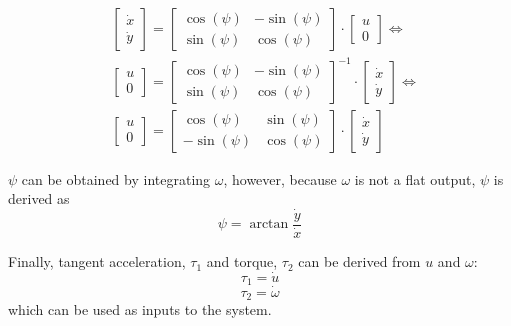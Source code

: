 \begin{equation}
\begin{split}
    & \begin{bmatrix}
        \dot{x} \\ \dot{y}
    \end{bmatrix} = 
    \begin{bmatrix}
        \cos(\psi) & - \sin(\psi) \\
        \sin(\psi) & \cos(\psi)
    \end{bmatrix} \cdot
    \begin{bmatrix}
        u \\ 0
    \end{bmatrix} \Leftrightarrow  \\
    & \begin{bmatrix}
        u \\ 0
    \end{bmatrix} = 
    \begin{bmatrix}
        \cos(\psi) & - \sin(\psi) \\
        \sin(\psi) & \cos(\psi)
    \end{bmatrix}^{-1} \cdot
    \begin{bmatrix}
        \dot{x} \\ \dot{y}
    \end{bmatrix} \Leftrightarrow \\
    & \begin{bmatrix}
        u \\ 0
    \end{bmatrix} = 
    \begin{bmatrix}
        \cos(\psi) & \sin(\psi) \\
        - \sin(\psi) & \cos(\psi)
    \end{bmatrix} \cdot
    \begin{bmatrix}
        \dot{x} \\ \dot{y}
    \end{bmatrix}
\end{split}
\end{equation}
\par $\psi$ can be obtained by integrating $\omega$, however, because $\omega$ is not a flat output, $\psi$ is derived as
\begin{equation}
    \psi = \arctan{\frac{\dot{y}}{\dot{x}}}
\end{equation}
\par Finally, tangent acceleration, $\tau_1$ and torque, $\tau_2$ can be derived from $u$ and $\omega$:
\begin{equation}
    \tau_1 = \dot{u}
\end{equation}
\begin{equation}
    \tau_2 = \dot{\omega}
\end{equation}
which can be used as inputs to the system.
